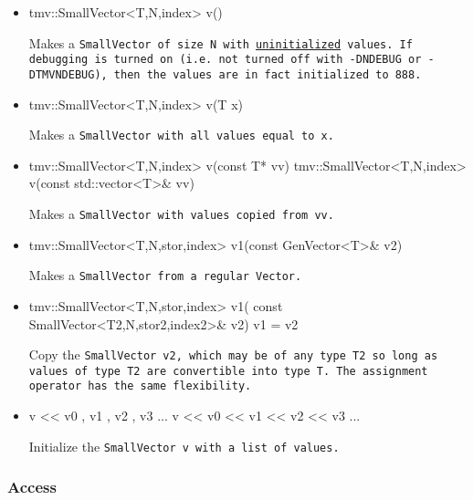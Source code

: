 \begin{itemize}
\item 
\begin{tmvcode}
tmv::SmallVector<T,N,index> v()
\end{tmvcode}
Makes a \tt{SmallVector} of size \tt{N}
with \underline{uninitialized} values.
If debugging is turned on (i.e. not turned off
with \tt{-DNDEBUG} or \tt{-DTMVNDEBUG}), then the values are in fact initialized to 888. 

\item
\begin{tmvcode}
tmv::SmallVector<T,N,index> v(T x)
\end{tmvcode}
Makes a \tt{SmallVector} with all values equal to \tt{x}.

\item
\begin{tmvcode}
tmv::SmallVector<T,N,index> v(const T* vv)
tmv::SmallVector<T,N,index> v(const std::vector<T>& vv)
\end{tmvcode}
Makes a \tt{SmallVector} with values copied from vv.

\item 
\begin{tmvcode}
tmv::SmallVector<T,N,stor,index> v1(const GenVector<T>& v2)
\end{tmvcode}
Makes a \tt{SmallVector} from a regular \tt{Vector}.

\item
\begin{tmvcode}
tmv::SmallVector<T,N,stor,index> v1(
      const SmallVector<T2,N,stor2,index2>& v2)
v1 = v2
\end{tmvcode}
Copy the \tt{SmallVector v2}, which may be of any type \tt{T2} so long
as values of type \tt{T2} are convertible into type \tt{T}.
The assignment operator has the same flexibility.

\item
\begin{tmvcode}
v << v0 , v1 , v2 , v3 ...
v << v0 << v1 << v2 << v3 ...
\end{tmvcode}
Initialize the \tt{SmallVector v} with a list of values.

\end{itemize}

\subsubsection{Access}
\label{SmallVector_Access}

